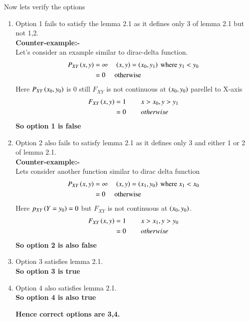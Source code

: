 \documentclass[journal,12pt,twocolumn]{IEEEtran}
\begin{document}
Now lets verify the options
\begin{enumerate}
\item Option 1 fails to satisfy the lemma 2.1 as it defines only 3 of lemma 2.1 but not 1,2.\\
\textbf{Counter-example:-}\\
Let's consider an example similar to dirac-delta function.
\begin{align}
P_{XY}\left(x,y\right)&=\infty \hspace{0.15in} \left(x,y\right)=\left(x_0,y_1\right)\text{ where }y_1<y_0  \nonumber \\
&=0 \hspace{0.15in} \text{ otherwise}
\end{align}
Here $P_{XY}\left(x_0,y_0\right)$ is 0 still $F_{XY}$ is not continuous at $\left(x_0,y_0\right)$ parellel to X-axis
\begin{align}
F_{XY}\left(x,y\right)&=1 \hspace{0.3in} x>x_0,y>y_1 \nonumber\\
&=0 \hspace{0.3in} otherwise
\end{align}
\textbf{So option 1 is false}
\item Option 2 also fails to satisfy lemma 2.1 as it defines only 3 and either 1 or 2 of lemma 2.1.\\
\textbf{Counter-example:-}\\
Lets consider another function similar to dirac delta function
\begin{align}
P_{XY}\left(x,y\right)&=\infty \hspace{0.15in} \left(x,y\right)=\left(x_1,y_0\right)\text{ where }x_1<x_0  \nonumber \\
&=0 \hspace{0.15in} \text{ otherwise}
\end{align}
Here $p_{XY}\left(Y=y_0\right)=0$ but $F_{XY}$ is not continuous at $\left(x_0,y_0\right)$.
\begin{align}
F_{XY}\left(x,y\right)&=1 \hspace{0.3in} x>x_1,y>y_0 \nonumber\\
&=0 \hspace{0.3in} otherwise
\end{align}
\textbf{So option 2 is also false}
\item Option 3 satisfies lemma 2.1.\\
\textbf{So option 3 is true}
\item Option 4 also satisfies lemma 2.1.\\
\textbf{So option 4 is also true}
\begin{center}
\textbf{Hence correct options are 3,4.}
\end{center}
\end{enumerate}
\end{document}
